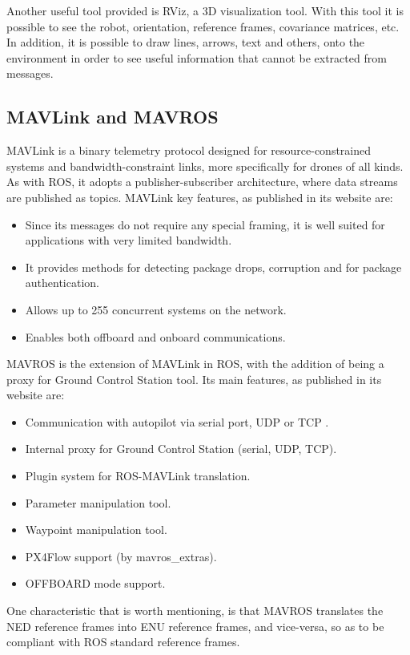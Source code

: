 Another useful tool provided is \ac{RViz}, a 3D visualization tool. With this tool it is possible to see the robot, orientation, reference frames, covariance matrices, etc. In addition, it is possible to draw lines, arrows, text and others, onto the environment in order to see useful information that cannot be extracted from messages.

\subsection{MAVLink and MAVROS}
\label{sssec:chapter2:drone:mavlink}
MAVLink \cite{mavlink} is a binary telemetry protocol designed for resource-constrained systems and bandwidth-constraint links, more specifically for drones of all kinds. As with \ac{ROS}, it adopts a publisher-subscriber architecture, where data streams are published as topics. MAVLink key features, as published in its website are:
\begin{itemize}
    \item Since its messages do not require any special framing, it is well suited for applications with very limited bandwidth.
    \item It provides methods for detecting package drops, corruption and for package authentication.
    \item Allows up to 255 concurrent systems on the network.
    \item Enables both offboard and onboard communications.
\end{itemize}
MAVROS \cite{mavros} is the extension of MAVLink in \ac{ROS}, with the addition of being a proxy for Ground Control Station tool. Its main features, as published in its website are:
\begin{itemize}
    \item Communication with autopilot via serial port, UDP or TCP .
    \item Internal proxy for Ground Control Station (serial, UDP, TCP).
    \item Plugin system for ROS-MAVLink translation.
    \item Parameter manipulation tool.
    \item Waypoint manipulation tool.
    \item PX4Flow support (by mavros\_extras).
    \item OFFBOARD mode support.
\end{itemize}

One characteristic that is worth mentioning, is that MAVROS translates the \ac{NED} reference frames into \ac{ENU} reference frames, and vice-versa, so as to be compliant with \ac{ROS} standard reference frames.

